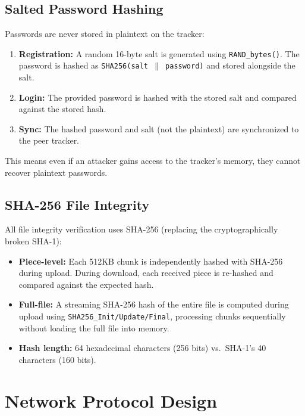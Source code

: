 \documentclass[12pt,a4paper]{article}
\begin{document}
\subsection{Salted Password Hashing}

Passwords are never stored in plaintext on the tracker:

\begin{enumerate}
    \item \textbf{Registration:} A random 16-byte salt is generated using \texttt{RAND\_bytes()}. The password is hashed as \texttt{SHA256(salt $\|$ password)} and stored alongside the salt.
    
    \item \textbf{Login:} The provided password is hashed with the stored salt and compared against the stored hash.
    
    \item \textbf{Sync:} The hashed password and salt (not the plaintext) are synchronized to the peer tracker.
\end{enumerate}

This means even if an attacker gains access to the tracker's memory, they cannot recover plaintext passwords.

\subsection{SHA-256 File Integrity}

All file integrity verification uses SHA-256 (replacing the cryptographically broken SHA-1):

\begin{itemize}
    \item \textbf{Piece-level:} Each 512KB chunk is independently hashed with SHA-256 during upload. During download, each received piece is re-hashed and compared against the expected hash.
    \item \textbf{Full-file:} A streaming SHA-256 hash of the entire file is computed during upload using \texttt{SHA256\_Init/Update/Final}, processing chunks sequentially without loading the full file into memory.
    \item \textbf{Hash length:} 64 hexadecimal characters (256 bits) vs.\ SHA-1's 40 characters (160 bits).
\end{itemize}

\section{Network Protocol Design}
\end{document}
